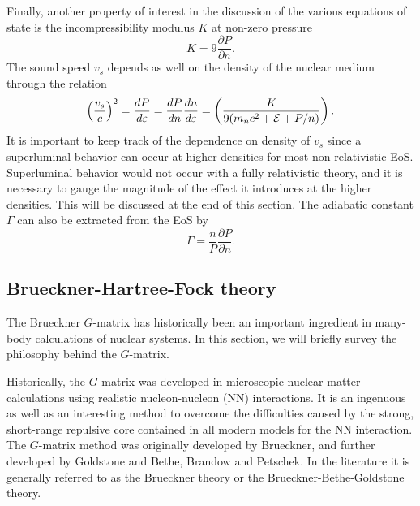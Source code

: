 \documentclass[%
oneside,                 %
final,                   %
10pt]{article}
\begin{document}
Finally, another property of interest in the discussion of the various 
equations of state  
is the incompressibility modulus $K$ at non-zero pressure
\begin{equation}
    K=9\frac{\partial P}{\partial n}.
    \label{eq:incompressibility}
\end{equation}
The sound speed $v_s$ depends as well on the density
of the nuclear medium through the relation
\begin{equation}
    \left(\frac{v_s}{c}\right)^2=\frac{dP}{d\varepsilon}=
    \frac{dP}{dn}\frac{dn}{d\varepsilon}=
    \left(\frac{K}{9(m_nc^2+{\cal E}+P/n)}\right).
    \label{eq:speedofsound}
\end{equation}
It is important to keep track of the dependence on density of $v_s$
since a superluminal behavior can occur at higher densities for most
non-relativistic EoS.
Superluminal behavior would
not occur with a fully relativistic theory, and it is necessary to
gauge the magnitude of the effect it introduces at the higher densities.
This will be discussed at the end of this section.
The adiabatic constant $\Gamma$ can also be extracted from the EoS
by 
\begin{equation}
    \Gamma = \frac{n}{P}\frac{\partial P}{\partial n}.
    \label{eq:adiabaticconstant}
\end{equation}





\subsection*{Brueckner-Hartree-Fock theory}


The Brueckner $G$-matrix has historically been an important ingredient
in many-body calculations of nuclear systems. In this section, we will
briefly survey the philosophy behind the $G$-matrix.

Historically, the $G$-matrix was developed in microscopic nuclear
matter calculations using realistic nucleon-nucleon (NN) interactions.
It is an ingenuous as well as an interesting method to overcome the
difficulties caused by the strong, short-range repulsive core contained
in all modern models for the NN interaction. The $G$-matrix method was
originally developed by Brueckner, and further
developed by Goldstone and Bethe, Brandow and Petschek. 
In the literature it is generally referred to as the
Brueckner theory or the Brueckner-Bethe-Goldstone theory.
\end{document}
